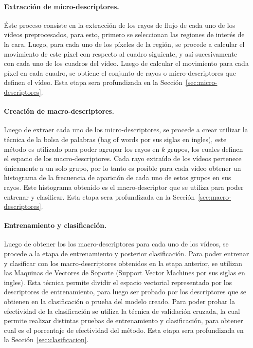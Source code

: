 \paragraph{Extracción de micro-descriptores.}
\label{ch1:par:microdescriptores}
Éste proceso consiste en la extracción de los rayos de flujo de cada uno de los vídeos preprocesados, para esto, primero se seleccionan las regiones de interés de la cara. Luego, para cada uno de los píxeles de la región, se procede a calcular el movimiento de este píxel con respecto al cuadro siguiente, y así sucesivamente con cada uno de los cuadros del vídeo. Luego de calcular el movimiento para cada píxel en cada cuadro, se obtiene el conjunto de rayos o micro-descriptores que definen el vídeo. Esta etapa sera profundizada en la Sección~\ref{sec:micro-descriptores}.

\paragraph{Creación de macro-descriptores.}
\label{ch1:par:macrodescriptores}
Luego de extraer cada uno de los micro-descriptores, se procede a crear utilizar la técnica de la bolsa de palabras (bag of words por sus siglas en ingles), este método es utilizado para poder agrupar los rayos en $k$ grupos, los cuales definen el espacio de los macro-descriptores. Cada rayo extraído de los vídeos pertenece únicamente a un solo grupo, por lo tanto es posible para cada vídeo obtener un histograma de la frecuencia de aparición de cada uno de estos grupos en sus rayos. Este histograma obtenido es el macro-descriptor que se utiliza para poder entrenar y clasificar. Esta etapa sera profundizada en la Sección~\ref{sec:macro-descriptores}.

\paragraph{Entrenamiento y clasificación.}
\label{ch1:par:entrnamientoyclasificacion}
Luego de obtener los los macro-des\-crip\-tores para cada uno de los vídeos, se procede a la etapa de entrenamiento y posterior clasificación. Para poder entrenar y clasificar con los macro-descriptores obtenidos en la etapa anterior, se utilizan las Maquinas de Vectores de Soporte (Support Vector Machines por sus siglas en ingles). Esta técnica permite dividir el espacio vectorial representado por los descriptores de entrenamiento, para luego ser probado por los descriptores que se obtienen en la clasificación o prueba del modelo creado. Para poder probar la efectividad de la clasificación se utiliza la técnica de validación cruzada, la cual permite realizar distintas pruebas de entrenamiento y clasificación, para obtener cual es el porcentaje de efectividad del método. Esta etapa sera profundizada en la Sección~\ref{sec:clasificacion}.


